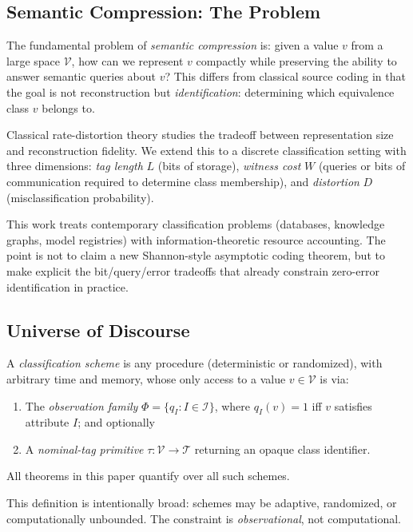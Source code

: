 \subsection{Semantic Compression: The Problem}

The fundamental problem of \emph{semantic compression} is: given a value $v$ from a large space $\mathcal{V}$, how can we represent $v$ compactly while preserving the ability to answer semantic queries about $v$? This differs from classical source coding in that the goal is not reconstruction but \emph{identification}: determining which equivalence class $v$ belongs to.

Classical rate-distortion theory \cite{shannon1959coding} studies the tradeoff between representation size and reconstruction fidelity. We extend this to a discrete classification setting with three dimensions: \emph{tag length} $L$ (bits of storage), \emph{witness cost} $W$ (queries or bits of communication required to determine class membership), and \emph{distortion} $D$ (misclassification probability).

This work treats contemporary classification problems (databases, knowledge graphs, model registries) with information-theoretic resource accounting. The point is not to claim a new Shannon-style asymptotic coding theorem, but to make explicit the bit/query/error tradeoffs that already constrain zero-error identification in practice.

\subsection{Universe of Discourse}

\begin{definition}
A \emph{classification scheme} is any procedure (deterministic or randomized), with arbitrary time and memory, whose only access to a value $v \in \mathcal{V}$ is via:
\begin{enumerate}
\item The \emph{observation family} $\Phi = \{q_I : I \in \mathcal{I}\}$, where $q_I(v) = 1$ iff $v$ satisfies attribute $I$; and optionally
\item A \emph{nominal-tag primitive} $\tau: \mathcal{V} \to \mathcal{T}$ returning an opaque class identifier.
\end{enumerate}
All theorems in this paper quantify over all such schemes.
\end{definition}

This definition is intentionally broad: schemes may be adaptive, randomized, or computationally unbounded. The constraint is \emph{observational}, not computational.

